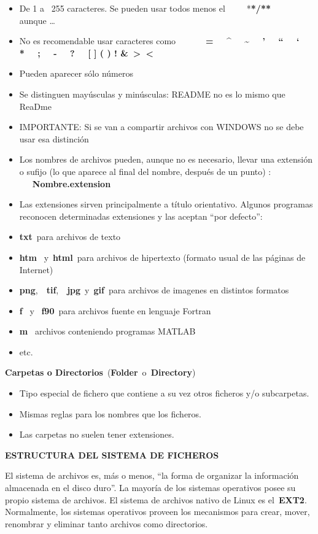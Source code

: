 \documentclass[
  jou,
  floatsintext,
  longtable,
  a4paper,
  nolmodern,
  notxfonts,
  notimes,
  12pt,
  colorlinks=true,linkcolor=blue,citecolor=blue,urlcolor=blue]{apa7}
\providecommand{\tightlist}{%
  \setlength{\itemsep}{0pt}\setlength{\parskip}{0pt}}
\begin{document}
\begin{itemize}
\item
  De 1 a~ 255 caracteres. Se pueden usar todos menos
  el~~~~~*\textbf{*/**}~~~~~ aunque \ldots{}
\item
  No es recomendable usar caracteres como~~~~~~~\textbf{=~~ \^{}~~
  \textasciitilde~~ '~~ ``~~ `~~ *~~ ;~~ -~~ ?~~ {[} {]} ( ) !
  \&~\textgreater~\textless{}}
\item
  Pueden aparecer sólo números
\item
  Se distinguen mayúsculas y minúsculas: README no es lo mismo que
  ReaDme
\item
  IMPORTANTE: Si se van a compartir archivos con WINDOWS no se debe usar
  esa distinción
\item
  Los nombres de archivos pueden, aunque no es necesario, llevar una
  extensión o sufijo (lo que aparece al final del nombre, después de un
  punto) : ~~~\textbf{Nombre.extension}
\item
  Las extensiones sirven principalmente a título orientativo. Algunos
  programas reconocen determinadas extensiones y las aceptan ``por
  defecto'':
\item
  \textbf{txt}~para archivos de texto
\item
  \textbf{htm}~ y~\textbf{html}~para archivos de hipertexto (formato
  usual de las páginas de Internet)
\item
  \textbf{png},~~\textbf{tif},~~\textbf{jpg}~y~\textbf{gif}~para
  archivos de imagenes en distintos formatos
\item
  \textbf{f}~ y ~\textbf{f90}~para archivos fuente en lenguaje Fortran
\item
  \textbf{m}~ archivos conteniendo programas MATLAB
\item
  etc.
\end{itemize}

\textbf{Carpetas o Directorios}~(\textbf{Folder}~o~\textbf{Directory})

\begin{itemize}
\tightlist
\item
  Tipo especial de fichero que contiene a su vez otros ficheros y/o
  subcarpetas.
\item
  Mismas reglas para los nombres que los ficheros.
\item
  Las carpetas no suelen tener extensiones.
\end{itemize}

\textbf{ESTRUCTURA DEL SISTEMA DE FICHEROS}

El sistema de archivos es, más o menos, ``la forma de organizar la
información almacenada en el disco duro''. La mayoría de los sistemas
operativos posee su propio sistema de archivos. El sistema de archivos
nativo de Linux es el~\textbf{EXT2}. Normalmente, los sistemas
operativos proveen los mecanismos para crear, mover, renombrar y
eliminar tanto archivos como directorios.
\end{document}
